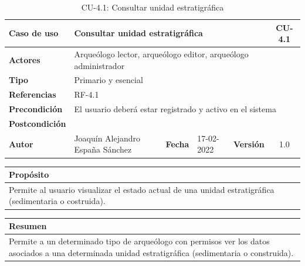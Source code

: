     \begin{table}[H]
    \begin{center}
        \begin{adjustbox}{width=\textwidth}
        \begin{tabular}{ | l | l | l | l | c | c | } 
            \hline
            \textbf{Caso de uso} & \multicolumn{4}{l|}{Consultar unidad estratigráfica} & \cellcolor{gray!50} \textbf{CU-4.1}\\
            \hline
            \textbf{Actores} & \multicolumn{5}{p{0.9\linewidth}|}{Arqueólogo lector, arqueólogo editor, arqueólogo administrador} \\
            \hline
            \textbf{Tipo} & \multicolumn{5}{l|}{Primario y esencial} \\
            \hline
            \textbf{Referencias} & \multicolumn{3}{l|}{RF-4.1} & \multicolumn{2}{l|}{ }\\
            \hline
            \textbf{Precondición} & \multicolumn{5}{l|}{El usuario deberá estar registrado y activo en el sistema} \\
            \hline
            \textbf{Postcondición} & \multicolumn{5}{l|}{ } \\
            \hline
            \textbf{Autor} & \multicolumn{1}{p{0.25\linewidth}|}{Joaquín Alejandro España Sánchez} & \textbf{Fecha} & 
            17-02-2022     & \textbf{Versión}                                                      & 1.0\\
            \hline
        \end{tabular}
        \end{adjustbox}
        \caption{CU-4.1: Consultar unidad estratigráfica}
        \label{tab:consult-ue}
    \end{center}
    \end{table}


    \begin{table}[H]
        \centering
        \begin{tabularx}{\textwidth}{@{} |L |@{}} \hline
            \textbf{Propósito} \\
            \hline
            Permite al usuario visualizar el estado actual de una unidad estratigráfica
            (sedimentaria o costruida). \\
            \hline
        \end{tabularx}
    \end{table}

    \begin{table}[H]
        \centering
        \begin{tabularx}{\textwidth}{@{} |L |@{}} \hline
            \textbf{Resumen} \\
            \hline
            Permite a un determinado tipo de arqueólogo con permisos ver los datos asociados
            a una determinada unidad estratigráfica (sedimentaria o construida). \\
            \hline
        \end{tabularx}
    \end{table}


